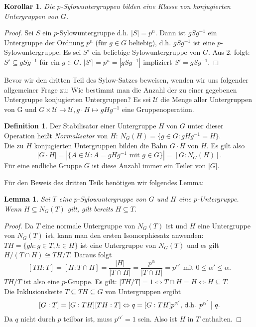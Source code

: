 \documentclass[12pt]{scrartcl} %
\newcommand{\divides}{\mathrel{\bigm|}}
\newtheorem{lemma}{Lemma}
\newtheorem{kor}{Korollar}
\theoremstyle{definition}
\newtheorem*{defn}{Definition}
\theoremstyle{remark}
\begin{document}
\begin{kor}
	Die $p$-Sylowuntergruppen bilden eine Klasse von konjugierten Untergruppen von $G$.
\end{kor}

\begin{proof}
	Sei $S$ ein $p$-Sylowuntergruppe d.h. $|S| = p^n$. Dann ist $gSg^{-1}$ ein Untergruppe der Ordnung $p^n$ (für $g \in G$ beliebig), d.h. $gSg^{-1}$ ist eine $p$-Sylowuntergruppe. Es sei $S'$ ein beliebige Sylowuntergruppe von $G$. Aus 2. folgt: $S' \subseteq gSg^{-1}$ für ein $g \in G$. $|S'| = p^n = |gSg^{-1}|$ impliziert $S' = gSg^{-1}$.
\end{proof}

Bevor wir den dritten Teil des Sylow-Satzes beweisen, wenden wir uns folgender allgemeiner Frage zu: Wie bestimmt man die Anzahl der zu einer gegebenen Untergruppe konjugierten Untergruppen? Es sei $\mathcal{U}$ die Menge aller Untergruppen von G und $ G \times \mathcal{U} \rightarrow \mathcal{U}, g \cdot H \mapsto gHg^{-1} $ eine Gruppenoperation.

\begin{defn}
	Der Stabilisator einer Untergruppe $H$ von $G$ unter dieser Operation heißt \emph{Normalisator} von $H$: $N_G(H) = \{ g \in G: gHg^{-1} = H \}$. \\
	Die zu $H$ konjugierten Untergruppen bilden die Bahn $G \cdot H$ von $H$. Es gilt also
	$$ |G \cdot H| = | \{ A \in \mathcal{U} : A = gHg^{-1} \text{ mit } g \in G \} | = [G:N_G(H)] .$$
	Für eine endliche Gruppe $G$ ist diese Anzahl immer ein Teiler von $|G|$.
\end{defn}

Für den Beweis des dritten Teils benötigen wir folgendes Lemma:

\begin{lemma}\label{lem:Sylow}
	Sei $T$ eine $p$-Sylowuntergruppe von $G$ und $H$ eine $p$-Untergruppe. Wenn $H \subseteq N_G(T)$ gilt, gilt bereits $H \subseteq T$.
\end{lemma}

\begin{proof}
	Da $T$ eine normale Untergruppe von $N_G(T)$ ist und $H$ eine Untergruppe von $N_G(T)$ ist, kann man den ersten Isomorphiesatz anwenden: $TH = \{ gh : g \in T, h \in H \}$ ist eine Untergruppe von $N_G(T)$ und es gilt $H/(T \cap H) \cong TH/T$. Daraus folgt
	$$ [TH : T] = [H : T \cap H] = \frac{|H|}{|T \cap H|} = \frac{p^{\alpha}}{|T \cap H|} = p^{\alpha '} \text{ mit } 0 \leq \alpha ' \leq \alpha.$$
	$TH/T$ ist also eine $p$-Gruppe. Es gilt: $|TH/T| = 1 \Leftrightarrow T \cap H = H \Leftrightarrow H \subseteq T$. \\
	Die Inklusionskette $T \subseteq TH \subseteq G$ von Untergruppen ergibt
	$$[G:T] = [G:TH][TH:T] \Leftrightarrow q = [G:TH]p^{\alpha '} \text{, d.h. } p^{\alpha '} \divides q.$$
	Da $q$ nicht durch $p$ teilbar ist, muss $p^{\alpha '} = 1$ sein. Also ist $H$ in $T$ enthalten.
\end{proof}
\end{document}
